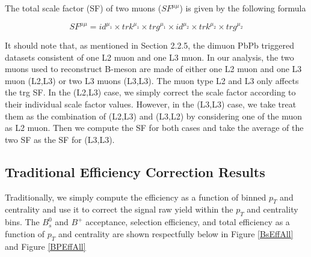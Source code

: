 The total scale factor (SF) of two muons ($SF^{\mu\mu}$) is given by the following formula

\begin{equation}
SF^{\mu\mu} = id^{\mu_1} \times trk^{\mu_1}  \times trg^{\mu_1}  \times id^{\mu_2}  \times trk^{\mu_2}  \times trg^{\mu_2} 
\end{equation}

It should note that, as mentioned in Section 2.2.5, the dimuon PbPb triggered datasets consistent of one L2 muon and one L3 muon. In our analysis, the two muons used to reconstruct B-meson are made of either one L2 muon and one L3 muon (L2,L3) or two L3 muons (L3,L3). The muon type L2 and L3 only affects the trg SF. In the (L2,L3) case, we simply correct the scale factor according to their individual scale factor values. However, in the (L3,L3) case, we take treat them as the combination of (L2,L3) and (L3,L2) by considering one of the muon as L2 muon. Then we compute the SF for both cases and take the average of the two SF as the SF for  (L3,L3).  

\subsection{Traditional Efficiency Correction Results}

Traditionally, we simply compute the efficiency as a function of binned $p_T$ and centrality and use it to correct the signal raw yield within the $p_T$ and centrality bins. The $B^0_s$ and $B^+$ acceptance, selection efficiency, and total efficiency as a function of $p_T$ and centrality are shown respectfully below in Figure \ref{BsEffAll} and Figure \ref{BPEffAll}


